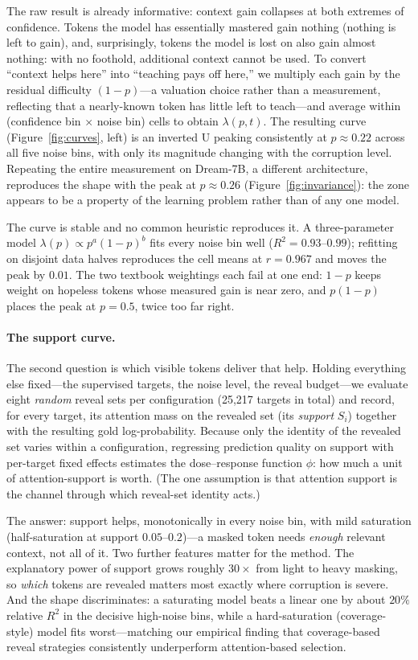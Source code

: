 \documentclass{article} %
\begin{document}
The raw result is already informative: context gain collapses at both extremes of confidence. Tokens the model has essentially mastered gain nothing (nothing is left to gain), and, surprisingly, tokens the model is lost on also gain almost nothing: with no foothold, additional context cannot be used. To convert ``context helps here'' into ``teaching pays off here,'' we multiply each gain by the residual difficulty $(1-p)$---a valuation choice rather than a measurement, reflecting that a nearly-known token has little left to teach---and average within (confidence bin $\times$ noise bin) cells to obtain $\lambda(p,t)$. The resulting curve (Figure~\ref{fig:curves}, left) is an inverted U peaking consistently at $p\approx0.22$ across all five noise bins, with only its magnitude changing with the corruption level. Repeating the entire measurement on Dream-7B, a different architecture, reproduces the shape with the peak at $p\approx0.26$ (Figure~\ref{fig:invariance}): the zone appears to be a property of the learning problem rather than of any one model.

The curve is stable and no common heuristic reproduces it. A three-parameter model $\lambda(p)\propto p^a(1-p)^b$ fits every noise bin well ($R^2=0.93$--$0.99$); refitting on disjoint data halves reproduces the cell means at $r=0.967$ and moves the peak by $0.01$. The two textbook weightings each fail at one end: $1-p$ keeps weight on hopeless tokens whose measured gain is near zero, and $p(1-p)$ places the peak at $p=0.5$, twice too far right.

\paragraph{The support curve.}
The second question is which visible tokens deliver that help. Holding everything else fixed---the supervised targets, the noise level, the reveal budget---we evaluate eight \emph{random} reveal sets per configuration (25{,}217 targets in total) and record, for every target, its attention mass on the revealed set (its \emph{support} $S_i$) together with the resulting gold log-probability. Because only the identity of the revealed set varies within a configuration, regressing prediction quality on support with per-target fixed effects estimates the dose--response function $\phi$: how much a unit of attention-support is worth. (The one assumption is that attention support is the channel through which reveal-set identity acts.)

The answer: support helps, monotonically in every noise bin, with mild saturation (half-saturation at support $0.05$--$0.2$)---a masked token needs \emph{enough} relevant context, not all of it. Two further features matter for the method. The explanatory power of support grows roughly $30\times$ from light to heavy masking, so \emph{which} tokens are revealed matters most exactly where corruption is severe. And the shape discriminates: a saturating model beats a linear one by about $20\%$ relative $R^2$ in the decisive high-noise bins, while a hard-saturation (coverage-style) model fits worst---matching our empirical finding that coverage-based reveal strategies consistently underperform attention-based selection.
\end{document}
